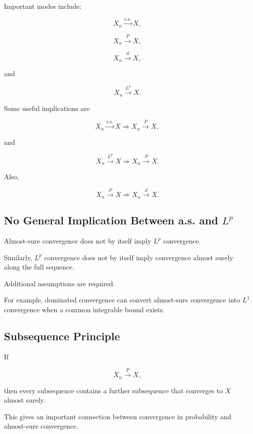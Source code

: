 Important modes include:

\[
\boxed{
X_n\xrightarrow{\text{a.s.}}X,
}
\]

\[
\boxed{
X_n\xrightarrow{P}X,
}
\]

\[
\boxed{
X_n\xrightarrow{d}X,
}
\]

and

\[
\boxed{
X_n\xrightarrow{L^p}X.
}
\]

Some useful implications are

\[
\boxed{
X_n\xrightarrow{\text{a.s.}}X
\Longrightarrow
X_n\xrightarrow{P}X,
}
\]

and

\[
\boxed{
X_n\xrightarrow{L^p}X
\Longrightarrow
X_n\xrightarrow{P}X.
}
\]

Also,

\[
\boxed{
X_n\xrightarrow{P}X
\Longrightarrow
X_n\xrightarrow{d}X.
}
\]

\subsection{No General Implication Between a.s. and \(L^p\)}
\label{subsec:as-lp-no-general}

Almost-sure convergence does not by itself imply \(L^p\) convergence.

Similarly, \(L^p\) convergence does not by itself imply convergence
almost surely along the full sequence.

Additional assumptions are required.

For example, dominated convergence can convert almost-sure convergence
into \(L^1\) convergence when a common integrable bound exists.

\subsection{Subsequence Principle}
\label{subsec:subsequence-principle}

If

\[
X_n\xrightarrow{P}X,
\]

then every subsequence contains a further subsequence that converges to
\(X\) almost surely.

This gives an important connection between convergence in probability
and almost-sure convergence.

